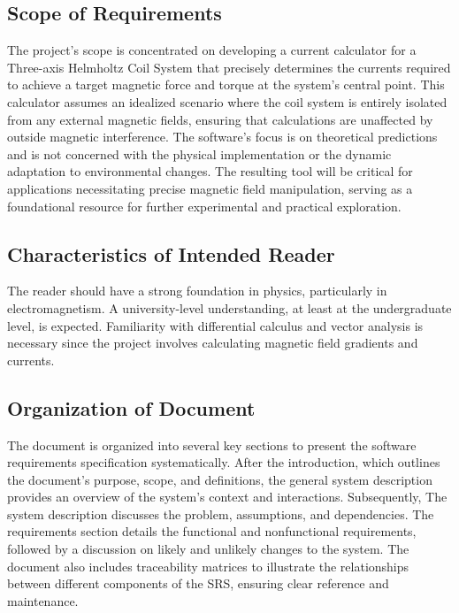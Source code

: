 \documentclass[12pt]{article}
\begin{document}
\subsection{Scope of Requirements} 
{
The project's scope is concentrated on developing a current calculator for a Three-axis Helmholtz Coil System that precisely determines the currents required to achieve a target magnetic force and torque at the system's central point. This calculator assumes an idealized scenario where the coil system is entirely isolated from any external magnetic fields, ensuring that calculations are unaffected by outside magnetic interference. The software's focus is on theoretical predictions and is not concerned with the physical implementation or the dynamic adaptation to environmental changes. The resulting tool will be critical for applications necessitating precise magnetic field manipulation, serving as a foundational resource for further experimental and practical exploration.
}  

\subsection{Characteristics of Intended Reader} \label{sec_IntendedReader}
{
The reader should have a strong foundation in physics, particularly in electromagnetism. A university-level understanding, at least at the undergraduate level, is expected. Familiarity with differential calculus and vector analysis is necessary since the project involves calculating magnetic field gradients and currents.

}

\subsection{Organization of Document}
{
The document is organized into several key sections to present the software requirements specification systematically. After the introduction, which outlines the document's purpose, scope, and definitions, the general system description provides an overview of the system's context and interactions. Subsequently, The system description discusses the problem, assumptions, and dependencies. The requirements section details the functional and nonfunctional requirements, followed by a discussion on likely and unlikely changes to the system. The document also includes traceability matrices to illustrate the relationships between different components of the SRS, ensuring clear reference and maintenance.
}
\end{document}
